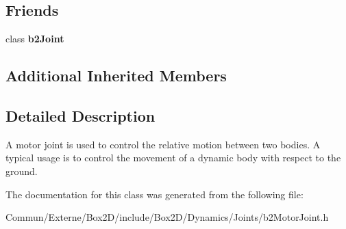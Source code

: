 \subsection*{Friends}
\begin{DoxyCompactItemize}
\item 
class {\bfseries b2\+Joint}\hypertarget{classb2_motor_joint_a54ade8ed3d794298108d7f4c4e4793fa}{}\label{classb2_motor_joint_a54ade8ed3d794298108d7f4c4e4793fa}

\end{DoxyCompactItemize}
\subsection*{Additional Inherited Members}


\subsection{Detailed Description}
A motor joint is used to control the relative motion between two bodies. A typical usage is to control the movement of a dynamic body with respect to the ground. 

The documentation for this class was generated from the following file\+:\begin{DoxyCompactItemize}
\item 
Commun/\+Externe/\+Box2\+D/include/\+Box2\+D/\+Dynamics/\+Joints/b2\+Motor\+Joint.\+h\end{DoxyCompactItemize}
